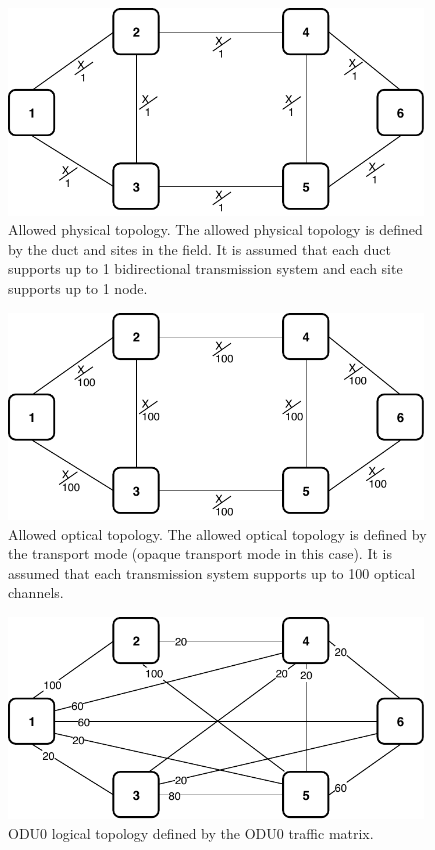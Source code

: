 \begin{figure}[h!]
\centering
\includegraphics[width=11cm]{sdf/ilp/opaque_survivability/figures/allowed_physical_topology}
\caption{Allowed physical topology. The allowed physical topology is defined by the duct and sites in the field. It is assumed that each duct supports up to 1 bidirectional transmission system and each site supports up to 1 node.}
\label{allowed_physical_high}
\end{figure}
\newpage
\begin{figure}[h!]
\centering
\includegraphics[width=11cm]{sdf/ilp/opaque_survivability/figures/allowed_optical_topology}
\caption{Allowed optical topology. The allowed optical topology is defined by the transport mode (opaque transport mode in this case). It is assumed that each transmission system supports up to 100 optical channels.}
\label{allowed_optical_high}
\end{figure}

\begin{figure}[h!]
\centering
\includegraphics[width=11cm]{sdf/ilp/opaque_survivability/figures/logical_topology_ODU0_high}
\caption{ODU0 logical topology defined by the ODU0 traffic matrix.}
\label{logical_ODU0_high}
\end{figure}

